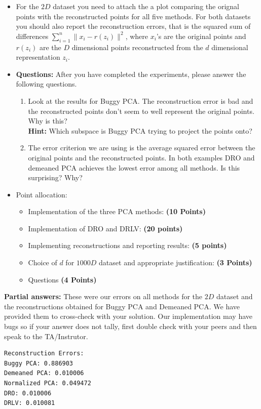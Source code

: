 \begin{itemize}
\item
For the $2D$ dataset you need to attach the a 
plot comparing the orignal points with the reconstructed points for all five
methods.
For both datasets you should also report the reconstruction errors, that is the squared sum of
differences $\sum_{i=1}^n \|x_i - r(z_i)\|^2$,
where $x_i$'s are the original points and $r(z_i)$ are the $D$ dimensional points
reconstructed from the 
$d$ dimensional representation $z_i$.

\item \textbf{Questions:} After you have completed the experiments, please answer the following questions.
\begin{enumerate}
\item Look at the results for Buggy PCA. The reconstruction error is bad and the
reconstructed points don't seem to well represent the original points. Why is
this? \\
\textbf{Hint: } Which subspace is Buggy PCA trying to project the points
onto?
\item The error criterion we are using is the average squared error 
between the original points and the reconstructed points.
In both examples DRO and demeaned PCA achieves the lowest error among all
methods. 
Is this surprising? Why?
\end{enumerate}

\item Point allocation:
\begin{itemize}
\item Implementation of the three PCA methods: \textbf{(10 Points)}
\item Implementation of DRO and DRLV: \textbf{(20 points)}
\item Implementing reconstructions and reporting results: \textbf{(5 points)}
\item Choice of $d$ for $1000D$ dataset and appropriate justification:
\textbf{(3 Points)}
\item Questions \textbf{(4 Points)}
\end{itemize}

\end{itemize}



\textbf{Partial answers:}
These were our errors on all methods for the $2D$ dataset and the reconstructions obtained for Buggy PCA and Demeaned PCA.
We have provided them to cross-check with your solution.
Our implementation may have bugs so if your answer does not tally, first double check with your peers and then speak to the TA/Instrutor.
\begin{verbatim}
Reconstruction Errors:
Buggy PCA: 0.886903
Demeaned PCA: 0.010006
Normalized PCA: 0.049472
DRO: 0.010006
DRLV: 0.010081
\end{verbatim}

